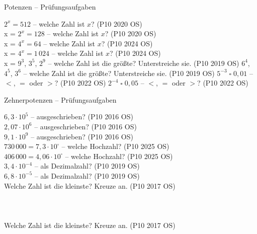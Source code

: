 \setcounter{aufgabe}{17}

\begin{aufgabe}{Potenzen – Prüfungsaufgaben}
\begin{teile}
\teil $2^x = 512$ – welche Zahl ist $x$? \hfill (P10 2020 OS) \\ x = \leerfeld
\teil $2^x = 128$ – welche Zahl ist $x$? \hfill (P10 2020 OS) \\ x = \leerfeld
\teil $4^x = 64$ – welche Zahl ist $x$? \hfill (P10 2024 OS) \\ x = \leerfeld
\teil $4^x = 1\,024$ – welche Zahl ist $x$? \hfill (P10 2024 OS) \\ x = \leerfeld
\teil $9^3$, $3^5$, $2^9$ – welche Zahl ist die größte? Unterstreiche sie. \hfill (P10 2019 OS)
\teil $6^4$, $4^5$, $3^6$ – welche Zahl ist die größte? Unterstreiche sie. \hfill (P10 2019 OS)
\teil $5^{-3} \;\square\; 0{,}01$ – $<$, $=$ oder $>$? \hfill (P10 2022 OS)
\teil $2^{-4} \;\square\; 0{,}05$ – $<$, $=$ oder $>$? \hfill (P10 2022 OS)
\end{teile}
\end{aufgabe}

\begin{aufgabe}{Zehnerpotenzen – Prüfungsaufgaben}
\begin{teile}
\teil $6{,}3 \cdot 10^{5}$ – ausgeschrieben? \hfill (P10 2016 OS) \\ \leerfeld
\teil $2{,}07 \cdot 10^{6}$ – ausgeschrieben? \hfill (P10 2016 OS) \\ \leerfeld
\teil $9{,}1 \cdot 10^{9}$ – ausgeschrieben? \hfill (P10 2016 OS) \\ \leerfeld
\teil $730\,000 = 7{,}3 \cdot 10^{\square}$ – welche Hochzahl? \hfill (P10 2025 OS) \\ \leerfeld
\teil $406\,000 = 4{,}06 \cdot 10^{\square}$ – welche Hochzahl? \hfill (P10 2025 OS) \\ \leerfeld
\teil $3{,}4 \cdot 10^{-4}$ – als Dezimalzahl? \hfill (P10 2019 OS) \\ \leerfeld
\teil $6{,}8 \cdot 10^{-5}$ – als Dezimalzahl? \hfill (P10 2019 OS) \\ \leerfeld
\teil Welche Zahl ist die kleinste? Kreuze an. \hfill (P10 2017 OS)\\  \\  \\  \\ 
\teil Welche Zahl ist die kleinste? Kreuze an. \hfill (P10 2017 OS)\\  \\  \\  \\ 
\end{teile}
\end{aufgabe}

